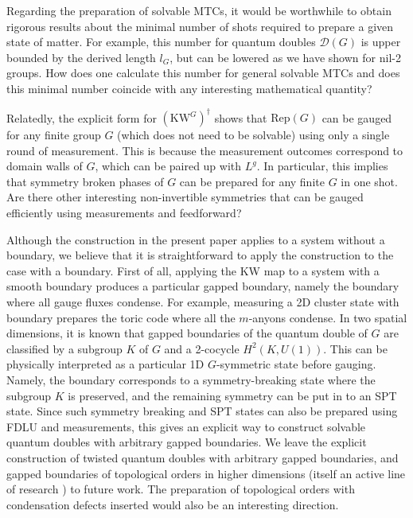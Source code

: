 \documentclass[nofootinbib,prx,twocolumn,showpacs,superscriptaddress,notitlepage,amsmath,amssymb]{revtex4-2}
\theoremstyle{definition}
\def\KW{\text{KW}}
\def\Rep{\text{Rep}}
\begin{document}
Regarding the preparation of solvable MTCs, it would be worthwhile to obtain rigorous results about the minimal number of shots required to prepare a given state of matter. For example, this number for quantum doubles $\mathcal D(G)$ is upper bounded by the derived length $l_G$, but can be lowered as we have shown for nil-2 groups. How does one calculate this number for general solvable MTCs and does this minimal number coincide with any interesting mathematical quantity?

Relatedly, the explicit form for $(\KW^G)^\dagger$ shows that $\Rep(G)$ can be gauged for any finite group $G$ (which does not need to be solvable) using only a single round of measurement. This is because the measurement outcomes correspond to domain walls of $G$, which can be paired up with $L^g$. In particular, this implies that symmetry broken phases of $G$ can be prepared for any finite $G$ in one shot. Are there other interesting non-invertible symmetries that can be gauged efficiently using measurements and feedforward?

Although the construction in the present paper applies to a system without a boundary, we believe that it is straightforward to apply the construction to the case with a boundary. First of all, applying the KW map to a system with a smooth boundary produces a particular gapped boundary, namely the boundary where all gauge fluxes condense. For example, measuring a 2D cluster state with boundary prepares the toric code where all the $m$-anyons condense. In two spatial dimensions, it is known that gapped boundaries of the quantum double of $G$ are classified by a subgroup $K$ of $G$ and a 2-cocycle $H^2(K,U(1))$\cite{beigi2011quantum,luo2022gapped}. This can be physically interpreted as a particular 1D $G$-symmetric state before gauging. Namely, the boundary corresponds to a symmetry-breaking state where the subgroup $K$ is preserved, and the remaining symmetry can be put in to an SPT state. Since such symmetry breaking and SPT states can also be prepared using FDLU and measurements, this gives an explicit way to construct solvable quantum doubles with arbitrary gapped boundaries. We leave the explicit construction of twisted quantum doubles with arbitrary gapped boundaries, and gapped boundaries of topological orders in higher dimensions (itself an active line of research \cite{zhao2022string,luo2022gapped,Ji2022boundary}) to future work. The preparation of topological orders with condensation defects inserted\cite{Bombin10Defect,KitaevKong12,YouJianWen13,roumpedakis2022higher} would also be an interesting direction.
\end{document}
